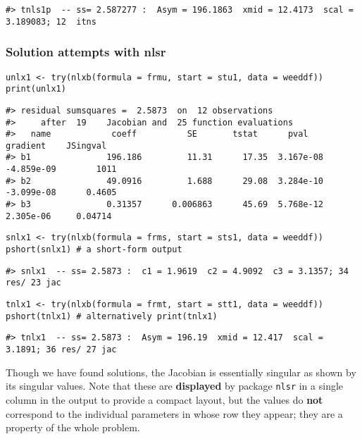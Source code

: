 \begin{verbatim}
#> tnls1p  -- ss= 2.587277 :  Asym = 196.1863  xmid = 12.4173  scal = 3.189083; 12  itns
\end{verbatim}

\hypertarget{solution-attempts-with-nlsr}{%
\subsubsection{Solution attempts with nlsr}\label{solution-attempts-with-nlsr}}

\begin{verbatim}
unlx1 <- try(nlxb(formula = frmu, start = stu1, data = weeddf))
print(unlx1) 
\end{verbatim}

\begin{verbatim}
#> residual sumsquares =  2.5873  on  12 observations
#>     after  19    Jacobian and  25 function evaluations
#>   name            coeff          SE       tstat      pval      gradient    JSingval   
#> b1               196.186         11.31      17.35  3.167e-08  -4.859e-09        1011  
#> b2               49.0916         1.688      29.08  3.284e-10  -3.099e-08      0.4605  
#> b3               0.31357      0.006863      45.69  5.768e-12   2.305e-06     0.04714
\end{verbatim}

\begin{verbatim}
snlx1 <- try(nlxb(formula = frms, start = sts1, data = weeddf))
pshort(snlx1) # a short-form output
\end{verbatim}

\begin{verbatim}
#> snlx1  -- ss= 2.5873 :  c1 = 1.9619  c2 = 4.9092  c3 = 3.1357; 34 res/ 23 jac
\end{verbatim}

\begin{verbatim}
tnlx1 <- try(nlxb(formula = frmt, start = stt1, data = weeddf))
pshort(tnlx1) # alternatively print(tnlx1)
\end{verbatim}

\begin{verbatim}
#> tnlx1  -- ss= 2.5873 :  Asym = 196.19  xmid = 12.417  scal = 3.1891; 36 res/ 27 jac
\end{verbatim}

Though we have found solutions, the Jacobian is essentially singular as
shown by its singular
values. Note that these are \textbf{displayed} by package \texttt{nlsr} in a single column in
the output to provide a compact layout, but the values do \textbf{not} correspond to
the individual parameters in
whose row they appear; they are a property of the whole problem.

